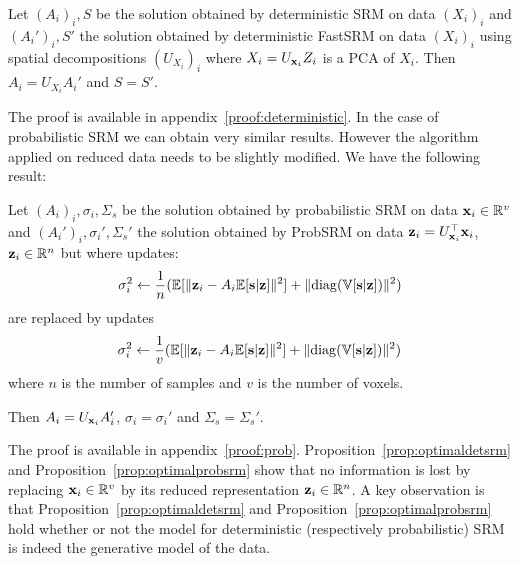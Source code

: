 \documentclass{article}
\begin{document}
\begin{proposition}
  Let $(A_i)_i, S$ be the solution obtained by deterministic SRM on data
  $(X_i)_i$ and $(A_i')_i, S'$ the solution obtained by deterministic FastSRM on
  data $(X_i)_i$ using spatial decompositions $(U_{X_i})_i$ where $X_i = U_{\mathbf{x}_i} Z_i$ is a PCA
  of $X_i$.
  Then $A_i = U_{X_i}A_i'$ and $S = S'$.
  
\label{prop:optimaldetsrm}
\end{proposition}
The proof is available in appendix~\ref{proof:deterministic}.
In the case of probabilistic SRM we can obtain very similar results.
%
However the
algorithm applied on reduced data needs to be slightly modified.
%
We have the following result:
\begin{proposition}
  Let $(A_i)_i, \sigma_i, \Sigma_s$ be the solution obtained by probabilistic SRM on data
  $\mathbf{x}_i \in \mathbb{R}^v$ and $(A_i')_i, \sigma_i', \Sigma_s'$ the solution obtained by ProbSRM on
  data $\mathbf{z}_i = U_{\mathbf{x}_i}^{\top} \mathbf{x}_i$, $\mathbf{z}_i \in \mathbb{R}^n$ but where updates:
  \begin{align}
    \sigma_i^2 \leftarrow \frac1{n} (\mathbb{E}[\| \mathbf{z}_i - A_i \mathbb{E}[\mathbf{s}|\mathbf{z}]\|^2] + \| {\rm diag}(\mathbb{V}[\mathbf{s} | \mathbf{z}]) \|^2)
  \end{align}
  are replaced by updates
  \begin{align}
    \sigma_i^2 \leftarrow \frac1{v} (\mathbb{E}[\| \mathbf{z}_i - A_i \mathbb{E}[\mathbf{s}|\mathbf{z}]\|^2] + \| {\rm diag}(\mathbb{V}[\mathbf{s} | \mathbf{z}]) \|^2)
  \end{align}
  where $n$ is the number of samples and $v$ is the number of voxels.

  Then $A_i = U_{\mathbf{x}_i}A_i'$, $\sigma_i =
  \sigma_i'$ and $\Sigma_s = \Sigma_s'$.
  
  \label{prop:optimalprobsrm}
\end{proposition}
  The proof is available in appendix~\ref{proof:prob}.
Proposition~\ref{prop:optimaldetsrm} and Proposition~\ref{prop:optimalprobsrm} show that
no information is lost by replacing $\mathbf{x}_i \in \mathbb{R}^v$ by its reduced
representation $\mathbf{z}_i \in \mathbb{R}^n$.
%
A key observation is that Proposition~\ref{prop:optimaldetsrm} and
Proposition~\ref{prop:optimalprobsrm} hold whether or
not the model for deterministic (respectively probabilistic) SRM is indeed the
generative model of the data.
%
\end{document}
